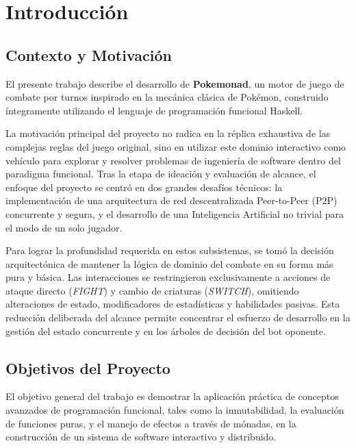 \section{Introducción}

\subsection{Contexto y Motivación}
El presente trabajo describe el desarrollo de \textbf{Pokemonad}, un motor de juego de combate por turnos inspirado en la mecánica clásica de Pokémon, construido íntegramente utilizando el lenguaje de programación funcional Haskell. 

La motivación principal del proyecto no radica en la réplica exhaustiva de las complejas reglas del juego original, sino en utilizar este dominio interactivo como vehículo para explorar y resolver problemas de ingeniería de software dentro del paradigma funcional. Tras la etapa de ideación y evaluación de alcance, el enfoque del proyecto se centró en dos grandes desafíos técnicos: la implementación de una arquitectura de red descentralizada Peer-to-Peer (P2P) concurrente y segura, y el desarrollo de una Inteligencia Artificial no trivial para el modo de un solo jugador. 

Para lograr la profundidad requerida en estos subsistemas, se tomó la decisión arquitectónica de mantener la lógica de dominio del combate en su forma más pura y básica. Las interacciones se restringieron exclusivamente a acciones de ataque directo (\textit{FIGHT}) y cambio de criaturas (\textit{SWITCH}), omitiendo alteraciones de estado, modificadores de estadísticas y habilidades pasivas. Esta reducción deliberada del alcance permite concentrar el esfuerzo de desarrollo en la gestión del estado concurrente y en los árboles de decisión del bot oponente.

\subsection{Objetivos del Proyecto}
El objetivo general del trabajo es demostrar la aplicación práctica de conceptos avanzados de programación funcional, tales como la inmutabilidad, la evaluación de funciones puras, y el manejo de efectos a través de mónadas, en la construcción de un sistema de software interactivo y distribuido. 

